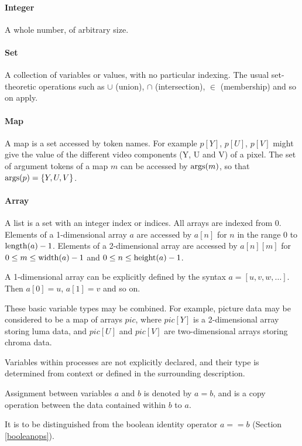 \paragraph*{Integer} A whole number, of arbitrary size.

\paragraph*{Set} A collection of variables or values, with no particular indexing. The usual
set-theoretic operations such as $\cup$ (union), $\cap$ (intersection), $\in$ (membership)
and so on apply.

\paragraph*{Map}

A map is a set accessed by token names. For example
$p[Y]$, $p[U]$, $p[V]$ might give the value of the different video components
(Y, U and V) of a pixel. The set of argument tokens of a map $m$ can be accessed by $\operatorname{args}(m)$,
so that $\operatorname{args}(p)=\{Y,U,V\}$.

\paragraph*{Array} 

A list is a set with an integer index or indices. All arrays are indexed from 0. 
Elements of a 1-dimensional array $a$ are accessed by $a[n]$ for $n$ in the
range 0 to $\operatorname{length}(a)-1$. Elements of a 2-dimensional array are accessed by
$a[n][m]$ for $0\leq m\leq\operatorname{width}(a)-1$ and $0\leq n\leq\operatorname{height}(a)-1$.

A 1-dimensional array can be explicitly defined by the syntax $a=[u, v, w, \hdots]$.
Then $a[0]=u$, 
$a[1]=v$ and so on.

These basic variable types may be combined. For example, picture data may be considered
to be a map of arrays $pic$, where $pic[Y]$ is a 2-dimensional array storing luma data,
and $pic[U]$ and $pic[V]$ are two-dimensional arrays storing chroma data.

Variables within processes are not explicitly declared, and their type is determined from
context or defined in the surrounding description.

Assignment between variables $a$ and $b$ is denoted by $a=b$, and is a copy
operation between the data contained within $b$ to $a$. 

It is to be distinguished from
the boolean identity operator $a==b$ (Section \ref{booleanops}).

